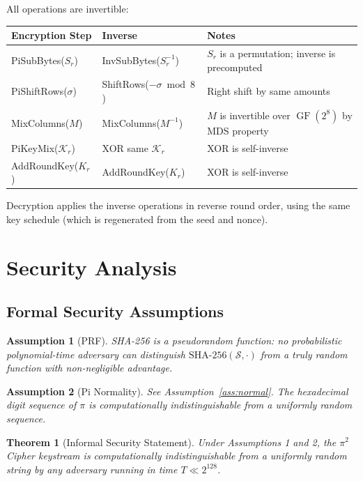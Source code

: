 \documentclass[12pt, a4paper]{article}
\newtheorem{theorem}{Theorem}[section]
\newtheorem{assumption}{Assumption}[section]
\DeclareMathOperator{\GF}{GF}
\newcommand{\seed}{\mathcal{S}}
\newcommand{\keystream}{\mathcal{K}}
\begin{document}
All operations are invertible:

\begin{center}
\renewcommand{\arraystretch}{1.3}
\begin{tabular}{lll}
\toprule
\textbf{Encryption Step} & \textbf{Inverse} & \textbf{Notes} \\
\midrule
PiSubBytes($S_r$) & InvSubBytes($S_r^{-1}$) & $S_r$ is a permutation; inverse is precomputed \\
PiShiftRows($\sigma$) & ShiftRows($-\sigma \bmod 8$) & Right shift by same amounts \\
MixColumns($M$) & MixColumns($M^{-1}$) & $M$ is invertible over $\GF(2^8)$ by MDS property \\
PiKeyMix($\keystream_r$) & XOR same $\keystream_r$ & XOR is self-inverse \\
AddRoundKey($K_r$) & AddRoundKey($K_r$) & XOR is self-inverse \\
\bottomrule
\end{tabular}
\end{center}

Decryption applies the inverse operations in reverse round order, using the same key schedule (which is regenerated from the seed and nonce).

\section{Security Analysis}

\subsection{Formal Security Assumptions}

\begin{assumption}[PRF]\label{ass:prf}
SHA-256 is a pseudorandom function: no probabilistic polynomial-time adversary can distinguish $\text{SHA-256}(\seed, \cdot)$ from a truly random function with non-negligible advantage.
\end{assumption}

\begin{assumption}[Pi Normality]
See Assumption~\ref{ass:normal}. The hexadecimal digit sequence of $\pi$ is computationally indistinguishable from a uniformly random sequence.
\end{assumption}

\begin{theorem}[Informal Security Statement]
Under Assumptions 1 and 2, the $\pi^2$ Cipher keystream is computationally indistinguishable from a uniformly random string by any adversary running in time $T \ll 2^{128}$.
\end{theorem}
\end{document}
